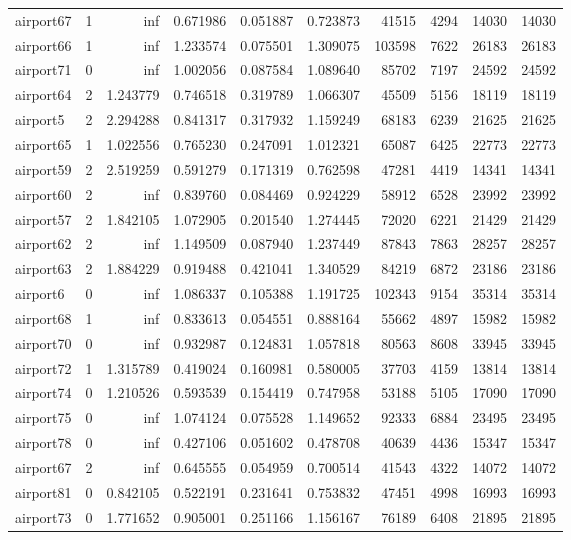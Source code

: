 \begin{longtable}{|l|r|r|r|r|r|r|r|r|r|}
airport67 & 1 & inf & 0.671986 & 0.051887 & 0.723873 & 41515 & 4294 & 14030 & 14030 \\
airport66 & 1 & inf & 1.233574 & 0.075501 & 1.309075 & 103598 & 7622 & 26183 & 26183 \\
airport71 & 0 & inf & 1.002056 & 0.087584 & 1.089640 & 85702 & 7197 & 24592 & 24592 \\
airport64 & 2 & 1.243779 & 0.746518 & 0.319789 & 1.066307 & 45509 & 5156 & 18119 & 18119 \\
airport5 & 2 & 2.294288 & 0.841317 & 0.317932 & 1.159249 & 68183 & 6239 & 21625 & 21625 \\
airport65 & 1 & 1.022556 & 0.765230 & 0.247091 & 1.012321 & 65087 & 6425 & 22773 & 22773 \\
airport59 & 2 & 2.519259 & 0.591279 & 0.171319 & 0.762598 & 47281 & 4419 & 14341 & 14341 \\
airport60 & 2 & inf & 0.839760 & 0.084469 & 0.924229 & 58912 & 6528 & 23992 & 23992 \\
airport57 & 2 & 1.842105 & 1.072905 & 0.201540 & 1.274445 & 72020 & 6221 & 21429 & 21429 \\
airport62 & 2 & inf & 1.149509 & 0.087940 & 1.237449 & 87843 & 7863 & 28257 & 28257 \\
airport63 & 2 & 1.884229 & 0.919488 & 0.421041 & 1.340529 & 84219 & 6872 & 23186 & 23186 \\
airport6 & 0 & inf & 1.086337 & 0.105388 & 1.191725 & 102343 & 9154 & 35314 & 35314 \\
airport68 & 1 & inf & 0.833613 & 0.054551 & 0.888164 & 55662 & 4897 & 15982 & 15982 \\
airport70 & 0 & inf & 0.932987 & 0.124831 & 1.057818 & 80563 & 8608 & 33945 & 33945 \\
airport72 & 1 & 1.315789 & 0.419024 & 0.160981 & 0.580005 & 37703 & 4159 & 13814 & 13814 \\
airport74 & 0 & 1.210526 & 0.593539 & 0.154419 & 0.747958 & 53188 & 5105 & 17090 & 17090 \\
airport75 & 0 & inf & 1.074124 & 0.075528 & 1.149652 & 92333 & 6884 & 23495 & 23495 \\
airport78 & 0 & inf & 0.427106 & 0.051602 & 0.478708 & 40639 & 4436 & 15347 & 15347 \\
airport67 & 2 & inf & 0.645555 & 0.054959 & 0.700514 & 41543 & 4322 & 14072 & 14072 \\
airport81 & 0 & 0.842105 & 0.522191 & 0.231641 & 0.753832 & 47451 & 4998 & 16993 & 16993 \\
airport73 & 0 & 1.771652 & 0.905001 & 0.251166 & 1.156167 & 76189 & 6408 & 21895 & 21895 \\

\end{longtable}

